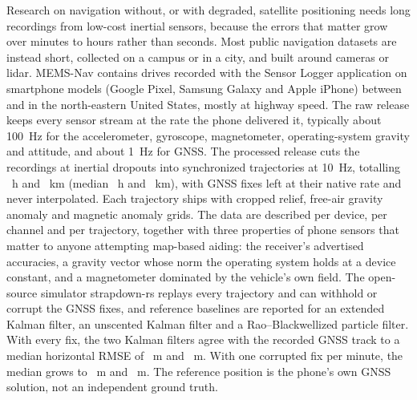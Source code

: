 Research on navigation without, or with degraded, satellite positioning needs long recordings from low-cost inertial sensors, because the errors that matter grow over minutes to hours rather than seconds. Most public navigation datasets are instead short, collected on a campus or in a city, and built around cameras or lidar. MEMS-Nav contains \numRawRecordings{} drives recorded with the Sensor Logger application on \numDevices{} smartphone models (Google Pixel, Samsung Galaxy and Apple iPhone) between \numRawFirst{} and \numRawLast{} in the north-eastern United States, mostly at highway speed. The raw release keeps every sensor stream at the rate the phone delivered it, typically about 100~Hz for the accelerometer, gyroscope, magnetometer, operating-system gravity and attitude, and about 1~Hz for GNSS. The processed release cuts the recordings at inertial dropouts into \numTrajectories{} synchronized trajectories at 10~Hz, totalling \numTotalHours~h and \numTotalKm~km (median \numMedianHours~h and \numMedianKm~km), with \numFixes{} GNSS fixes left at their native rate and never interpolated. Each trajectory ships with cropped relief, free-air gravity anomaly and magnetic anomaly grids. The data are described per device, per channel and per trajectory, together with three properties of phone sensors that matter to anyone attempting map-based aiding: the receiver's advertised accuracies, a gravity vector whose norm the operating system holds at a device constant, and a magnetometer dominated by the vehicle's own field. The open-source simulator strapdown-rs replays every trajectory and can withhold or corrupt the GNSS fixes, and reference baselines are reported for an extended Kalman filter, an unscented Kalman filter and a Rao--Blackwellized particle filter. With every fix, the two Kalman filters agree with the recorded GNSS track to a median horizontal RMSE of \numEkfFullMedian~m and \numUkfFullMedian~m. With one corrupted fix per minute, the median grows to \numEkfDegradedMedian~m and \numUkfDegradedMedian~m. The reference position is the phone's own GNSS solution, not an independent ground truth.
